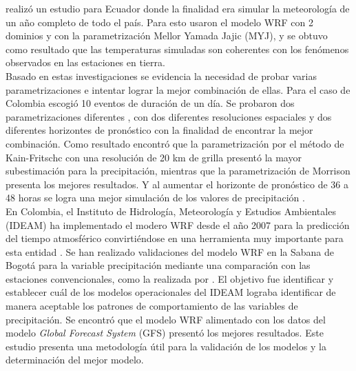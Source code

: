 \citet{Parra2012} realizó un estudio para Ecuador donde la finalidad era simular la meteorología de un año completo de todo el país. Para esto usaron el modelo WRF con 2 dominios y con la parametrización Mellor Yamada Jajic (MYJ), y se obtuvo como resultado que las temperaturas simuladas son coherentes con los fenómenos observados en las estaciones en tierra.\\


Basado en estas investigaciones se evidencia la necesidad de probar varias parametrizaciones e intentar lograr la mejor combinación de ellas. Para el caso de Colombia \citet{Uribe2012} escogió 10 eventos de duración de un día. Se probaron dos parametrizaciones diferentes , con dos diferentes resoluciones espaciales y dos diferentes horizontes de pronóstico con la finalidad de encontrar la mejor combinación. Como resultado encontró que la parametrización por el método de Kain-Fritschc con una resolución de 20 km de grilla presentó la mayor subestimación para la precipitación, mientras que la parametrización de Morrison presenta los mejores resultados. Y al aumentar el horizonte de pronóstico de 36 a 48 horas se logra una mejor simulación de los valores de precipitación \citep{Uribe2012}.\\

En Colombia, el Instituto de Hidrología, Meteorología y Estudios Ambientales (IDEAM) ha implementado el modero WRF desde el año 2007 para la predicción del tiempo atmosférico convirtiéndose en una herramienta muy importante para esta entidad \citep{Arango2011}. Se han realizado validaciones del modelo WRF en la Sabana de Bogotá para la variable precipitación mediante una comparación con las estaciones convencionales, como la realizada por \citet{Mejia2012}. El objetivo fue identificar y establecer cuál de los modelos operacionales del IDEAM lograba identificar de manera aceptable los patrones de comportamiento de las variables de precipitación. Se encontró que el modelo WRF alimentado con los datos del modelo \textit{Global Forecast System} (GFS) presentó los mejores resultados. Este estudio presenta una metodología útil para la validación de los modelos y la determinación del mejor modelo.\\








